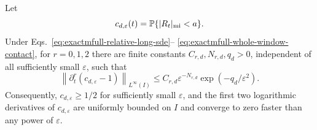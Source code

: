 \begin{lemma}
\label{lem:exactmfull-contact-tail}
Let
\begin{equation}
 c_{d,\varepsilon}(t)
 =\mathbb P\{|R_t|_{\rm mi}<a\}.
 \label{eq:exactmfull-contact-probability}
\end{equation}
Under Eqs.~\eqref{eq:exactmfull-relative-long-sde}--%
\eqref{eq:exactmfull-whole-window-contact}, for \(r=0,1,2\) there are finite
constants \(C_{r,d},N_{r,d},q_d>0\), independent of all sufficiently small
\(\varepsilon\), such that
\begin{equation}
 \left\|\partial_t^r(c_{d,\varepsilon}-1)\right\|_{L^\infty(I)}
 \le C_{r,d}\varepsilon^{-N_{r,d}}
       \exp(-q_d/\varepsilon^2).
 \label{eq:exactmfull-contact-tail-bound}
\end{equation}
Consequently, \(c_{d,\varepsilon}\ge1/2\) for sufficiently small
\(\varepsilon\), and the first two logarithmic derivatives of
\(c_{d,\varepsilon}\) are uniformly bounded on \(I\) and converge to zero
faster than any power of \(\varepsilon\).
\end{lemma}

